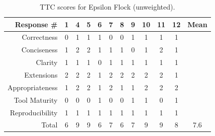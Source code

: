 \begin{table}[tbp]
	\centering
	\begin{tabular}{|r|c|c|c|c|c|c|c|c|c|c|c|}
		\hline
		\textbf{Response \#} & \textbf{1} & \textbf{4} & \textbf{5} & \textbf{6} & \textbf{7} & \textbf{8} & \textbf{9} & \textbf{10} & \textbf{11} & \textbf{12} & \textbf{Mean} \\
		\hline
		\hline
		Correctness          & 0          & 1          & 1          & 1          & 0          & 0          & 1          & 1     
		        & 1           & 1           & \\
		\hline                                                                                                     
		Conciseness          & 1          & 2          & 2          & 1          & 1          & 1          & 0          & 1
		        & 2           & 1           & \\
		\hline                                                                                                     
		Clarity              & 1          & 1          & 1          & 0          & 1          & 1          & 1          & 1
		        & 1           & 1           & \\
		\hline                                                                                                     
		Extensions           & 2          & 2          & 2          & 1          & 2          & 2          & 2          & 2
		        & 2           & 1           & \\
		\hline                                                                                                     
		Appropriateness      & 1         & 2          & 2          & 1          & 2          & 1           & 1          & 2 
		        & 2           & 2           & \\
		\hline                                                                                                     
		Tool Maturity        & 0         & 0          & 0          & 1          & 0          & 0           & 1          & 1
		        & 0           & 1           & \\
		\hline                                                                                                     
		Reproducibility      & 1         & 1          & 1          & 1          & 1          & 1          & 1          & 1 
		        & 1           & 1           & \\
		\hline                                                                                                     
		\hline                                                                                                     
		Total                & 6         & 9          & 9          & 6          & 7          & 6          & 7          & 9 
		        & 9           & 8           & 7.6 \\
		\hline
	\end{tabular}
	\caption{TTC scores for Epsilon Flock (unweighted).}
	\label{tab:flock_scores}
\end{table}

